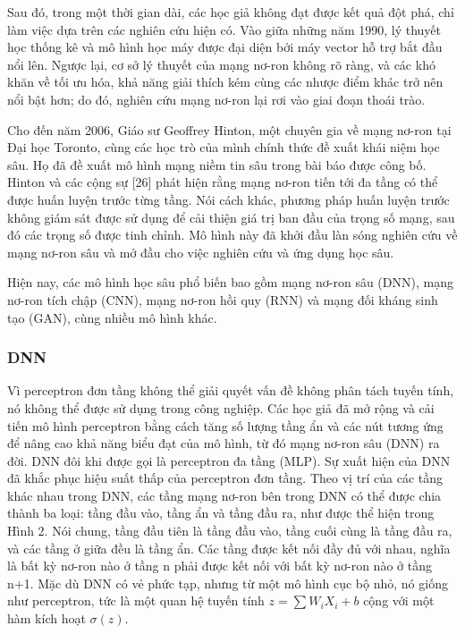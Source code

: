 \documentclass[a4paper]{article}
\begin{document}
Sau đó, trong một thời gian dài, các học giả không đạt được kết quả đột phá, chỉ làm việc dựa trên các nghiên cứu hiện có. Vào giữa những năm 1990, lý thuyết học thống kê và mô hình học máy được đại diện bởi máy vector hỗ trợ bắt đầu nổi lên. Ngược lại, cơ sở lý thuyết của mạng nơ-ron không rõ ràng, và các khó khăn về tối ưu hóa, khả năng giải thích kém cùng các nhược điểm khác trở nên nổi bật hơn; do đó, nghiên cứu mạng nơ-ron lại rơi vào giai đoạn thoái trào.

Cho đến năm 2006, Giáo sư Geoffrey Hinton, một chuyên gia về mạng nơ-ron tại Đại học Toronto, cùng các học trò của mình chính thức đề xuất khái niệm học sâu. Họ đã đề xuất mô hình mạng niềm tin sâu trong bài báo được công bố. Hinton và các cộng sự [26] phát hiện rằng mạng nơ-ron tiến tới đa tầng có thể được huấn luyện trước từng tầng. Nói cách khác, phương pháp huấn luyện trước không giám sát được sử dụng để cải thiện giá trị ban đầu của trọng số mạng, sau đó các trọng số được tinh chỉnh. Mô hình này đã khởi đầu làn sóng nghiên cứu về mạng nơ-ron sâu và mở đầu cho việc nghiên cứu và ứng dụng học sâu.

Hiện nay, các mô hình học sâu phổ biến bao gồm mạng nơ-ron sâu (DNN), mạng nơ-ron tích chập (CNN), mạng nơ-ron hồi quy (RNN) và mạng đối kháng sinh tạo (GAN), cùng nhiều mô hình khác.
\subsubsection{DNN}

Vì perceptron đơn tầng không thể giải quyết vấn đề không phân tách tuyến tính, nó không thể được sử dụng trong công nghiệp. Các học giả đã mở rộng và cải tiến mô hình perceptron bằng cách tăng số lượng tầng ẩn và các nút tương ứng để nâng cao khả năng biểu đạt của mô hình, từ đó mạng nơ-ron sâu (DNN) ra đời. DNN đôi khi được gọi là perceptron đa tầng (MLP). Sự xuất hiện của DNN đã khắc phục hiệu suất thấp của perceptron đơn tầng. Theo vị trí của các tầng khác nhau trong DNN, các tầng mạng nơ-ron bên trong DNN có thể được chia thành ba loại: tầng đầu vào, tầng ẩn và tầng đầu ra, như được thể hiện trong Hình 2. Nói chung, tầng đầu tiên là tầng đầu vào, tầng cuối cùng là tầng đầu ra, và các tầng ở giữa đều là tầng ẩn. Các tầng được kết nối đầy đủ với nhau, nghĩa là bất kỳ nơ-ron nào ở tầng n phải được kết nối với bất kỳ nơ-ron nào ở tầng n+1. Mặc dù DNN có vẻ phức tạp, nhưng từ một mô hình cục bộ nhỏ, nó giống như perceptron, tức là một quan hệ tuyến tính \( z = \sum W_i X_i + b \) cộng với một hàm kích hoạt \( \sigma(z) \).
\end{document}
